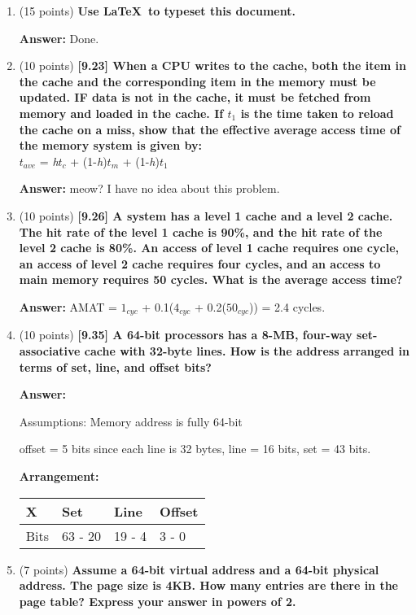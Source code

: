 \documentclass[letterpaper,10pt,onecolumn,titlepage]{article}
\begin{document}
\begin{enumerate}
\item (15 points) \textbf{Use \LaTeX\ to typeset this document.}

\textbf{Answer:} Done.

\item (10 points) \textbf{[9.23] When a CPU writes to the cache, both the item in the cache and the corresponding item in the memory must be updated. IF data is not in the cache, it must be fetched from memory and loaded in the cache. If $t_1$ is the time taken to reload the cache on a miss, show that the effective average access time of the memory system is given by:}\\
$t_{ave}$ = \textit{h}$t_c$ + (1-\textit{h})$t_m$ + (1-\textit{h})$t_1$

\textbf{Answer:} meow? I have no idea about this problem.

\item (10 points) \textbf{[9.26] A system has a level 1 cache and a level 2 cache. The hit rate of the level 1 cache is 90\%, and the hit rate of the level 2 cache is 80\%. An access of level 1 cache requires one cycle, an access of level 2 cache requires four cycles, and an access to main memory requires 50 cycles. What is the average access time?}

\textbf{Answer:} AMAT = $1_{cyc}$ + 0.1($4_{cyc}$ + 0.2($50_{cyc}$)) = 2.4 cycles.

\item (10 points) \textbf{[9.35] A 64-bit processors has a 8-MB, four-way set-associative cache with 32-byte lines. How is the address arranged in terms of set, line, and offset bits?}

\textbf{Answer:} 

Assumptions: Memory address is fully 64-bit

offset = 5 bits since each line is 32 bytes, line = 16 bits, set = 43 bits.

\textbf{Arrangement:}
\begin{tabular}{| l | l | l | l |}
    \hline
    X & Set & Line & Offset \\ \hline
    Bits & 63 - 20 & 19 - 4 & 3 - 0\\ \hline
\end{tabular}

\item (7 points) \textbf{Assume a 64-bit virtual address and a 64-bit physical address. The page size is 4KB. How many entries are there in the page table? Express your answer in powers of 2.}


\end{enumerate}
\end{document}
